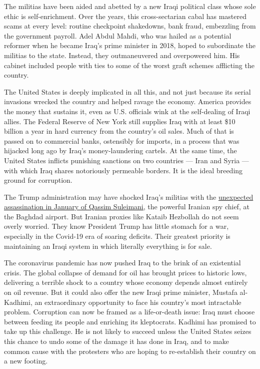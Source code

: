 The militias have been aided and abetted by a new Iraqi political class
whose sole ethic is self-enrichment. Over the years, this
cross-sectarian cabal has mastered scams at every level: routine
checkpoint shakedowns, bank fraud, embezzling from the government
payroll. Adel Abdul Mahdi, who was hailed as a potential reformer when
he became Iraq's prime minister in 2018, hoped to subordinate the
militias to the state. Instead, they outmaneuvered and overpowered him.
His cabinet included people with ties to some of the worst graft schemes
afflicting the country.

The United States is deeply implicated in all this, and not just because
its serial invasions wrecked the country and helped ravage the economy.
America provides the money that sustains it, even as U.S. officials wink
at the self-dealing of Iraqi allies. The Federal Reserve of New York
still supplies Iraq with at least \$10 billion a year in hard currency
from the country's oil sales. Much of that is passed on to commercial
banks, ostensibly for imports, in a process that was hijacked long ago
by Iraq's money-laundering cartels. At the same time, the United States
inflicts punishing sanctions on two countries --- Iran and Syria ---
with which Iraq shares notoriously permeable borders. It is the ideal
breeding ground for corruption.

The Trump administration may have shocked Iraq's militias with the
\href{https://www.nytimes3xbfgragh.onion/2020/01/11/us/politics/iran-trump.html}{unexpected
assassination in January of Qassim Suleimani,} the powerful Iranian spy
chief, at the Baghdad airport. But Iranian proxies like Kataib Hezbollah
do not seem overly worried. They know President Trump has little stomach
for a war, especially in the Covid-19 era of soaring deficits. Their
greatest priority is maintaining an Iraqi system in which literally
everything is for sale.

The coronavirus pandemic has now pushed Iraq to the brink of an
existential crisis. The global collapse of demand for oil has brought
prices to historic lows, delivering a terrible shock to a country whose
economy depends almost entirely on oil revenue. But it could also offer
the new Iraqi prime minister, Mustafa al-Kadhimi, an extraordinary
opportunity to face his country's most intractable problem. Corruption
can now be framed as a life-or-death issue: Iraq must choose between
feeding its people and enriching its kleptocrats. Kadhimi has promised
to take up this challenge. He is not likely to succeed unless the United
States seizes this chance to undo some of the damage it has done in
Iraq, and to make common cause with the protesters who are hoping to
re-establish their country on a new footing.

